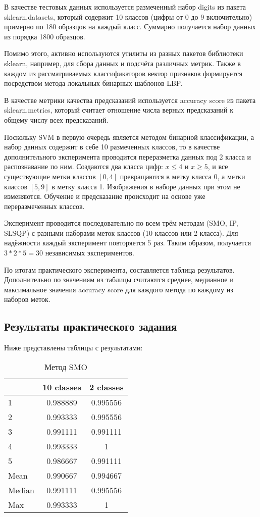 В качестве тестовых данных используется размеченный набор digits из пакета sklearn.datasets, который содержит 10 классов (цифры от 0 до 9 включительно) примерно по 180 образцов на каждый класс. Суммарно получается набор данных из порядка 1800 образцов.

Помимо этого, активно используются утилиты из разных пакетов библиотеки sklearn, например, для сбора данных и подсчёта различных метрик. Также в каждом из рассматриваемых классификаторов вектор признаков формируется посредством метода локальных бинарных шаблонов LBP.

В качестве метрики качества предсказаний используется accuracy score из пакета sklearn.metrics, который считает отношение числа верных предсказаний к общему числу всех предсказаний.

Поскольку SVM в первую очередь является методом бинарной классификации, а набор данных содержит в себе 10 размеченных классов, то в качестве дополнительного эксперимента проводится переразметка данных под 2 класса и распознавание по ним. Создаются два класса цифр: $x \leq 4$ и $x \geq 5$, и все существующие метки классов $[0, 4]$ превращаются в метку класса 0, а метки классов $[5, 9]$ в метку класса 1. Изображения в наборе данных при этом не изменяются. Обучение и предсказание происходит на основе уже переразмеченных классов.

Эксперимент проводится последовательно по всем трём методам (SMO, IP, SLSQP) с разными наборами меток классов (10 классов или 2 класса). Для надёжности каждый эксперимент повторяется 5 раз. Таким образом, получается $3 * 2 * 5 = 30$ независимых экспериментов.

По итогам практического эксперимента, составляется таблица результатов. Дополнительно по значениям из таблицы считаются среднее, медианное и максимальное значения accuracy score для каждого метода по каждому из наборов меток.

\subsection{Результаты практического задания}
Ниже представлены таблицы с результатами:

\begin{table}[H]
    \centering
    \begin{tabular}{|l||c|c|}
        \hline
        & 10 classes & 2 classes \\\hline\hline
        1 & 0.988889 & 0.995556 \\\hline
        2 & 0.993333 & 0.995556 \\\hline
        3 & 0.991111 & 0.991111 \\\hline
        4 & 0.993333 & 1 \\\hline
        5 & 0.986667 & 0.991111 \\\hline
        Mean & 0.990667 & 0.994667 \\\hline
        Median & 0.991111 & 0.995556 \\\hline
        Max & 0.993333 & 1 \\\hline
    \end{tabular}
    \caption{Метод SMO}
\end{table}

